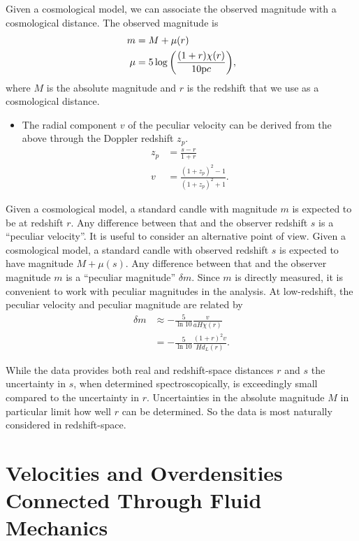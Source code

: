 \documentclass[11pt, oneside]{article}   	%
\begin{document}
Given a cosmological model, we can associate the observed magnitude
with a cosmological distance.  The observed magnitude is
\begin{align}
m & =M + \mu(r) \\
\mu & = 5\log{
	\left(
		\frac{(1+r)\chi(r)}{10 \text pc}
	\right)
},
\end{align}
where $M$ is the absolute magnitude and
 $r$ is the redshift that
we use as a cosmological distance.  
\begin{itemize}
\item The radial component $v$ of the peculiar velocity  can be derived from the above through
the Doppler redshift $z_p$.
\begin{align}
z_p & = \frac{s-r}{1+r}\\
v & = \frac{(1+z_p)^2-1}{(1+z_p)^2+1}.
\end{align}
\end{itemize}

Given a cosmological model, a standard candle with magnitude $m$ is expected
to be at redshift $r$.  Any difference between that and the observer redshift $s$ is a
``peculiar velocity''.
It is useful to consider an alternative point of view.   Given a cosmological model, a standard candle with observed
redshift $s$ is expected to have magnitude $M+\mu(s)$.
Any difference between that and the observer magnitude $m$ is a
``peculiar magnitude'' $\delta m$.  Since $m$ is directly measured, it is convenient to work with
peculiar magnitudes in the analysis.
At low-redshift,  the peculiar velocity and peculiar magnitude
are related by
\begin{align}
\delta m & \approx -\frac{5}{\ln{10}}\frac{v}{aH\chi(r)}\\
& = -\frac{5}{\ln{10}}\frac{(1+r)^2v}{Hd_L(r)}. 
\end{align}



While the data provides both real and redshift-space distances $r$ and $s$ the uncertainty in
$s$, when determined spectroscopically, is exceedingly small compared to the uncertainty in $r$.
Uncertainties in the absolute magnitude  $M$ in particular limit how well $r$ can be
determined.  So the data is most naturally considered in redshift-space.

\section{Velocities and Overdensities Connected Through Fluid Mechanics}
\end{document}
